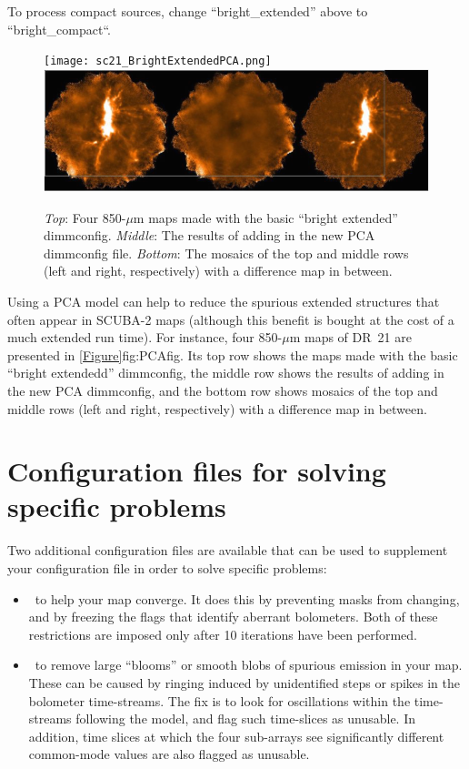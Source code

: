 To process compact sources, change “bright\_extended” above to “bright\_compact“.

\begin{figure}
\texttt{[image: sc21\_BrightExtendedPCA.png]}\\
\includegraphics[width=0.9\linewidth]{sc21_PCADifference.png}
\caption[PCA dimmconfig results]
   {\textit{Top}: Four 850-$\mu$m maps made with the basic ``bright extended'' dimmconfig. \textit{Middle}: The results of adding in the new PCA dimmconfig file. \textit{Bottom}: The mosaics of the top and middle rows (left and right, respectively) with a difference map in between.}
   \label{fig:PCAfig}
\end{figure}

Using a PCA model can help to reduce the spurious extended structures
that often appear in SCUBA-2 maps (although this benefit is bought at
the cost of a much extended run time). For instance, four 850-$\mu$m
maps of DR~21 are presented in \cref{Figure}{fig:PCAfig}{}.  Its top
row shows the maps made with the basic ``bright extendedd''
dimmconfig, the middle row shows the results of adding in the new PCA
dimmconfig, and the bottom row shows mosaics of the top and middle
rows (left and right, respectively) with a difference map in between.

\section{Configuration files for solving specific problems}
\label{sec:problem}

Two additional configuration files are available that can be used to supplement your
configuration file in order to solve specific problems:

\begin{itemize}[noitemsep]

\item \fixconvergence\ to help your map converge. It does this by preventing masks
from changing, and by freezing the flags that identify aberrant bolometers. Both of
these restrictions are imposed only after 10 iterations have been performed.

\item \fixblobs\ to remove large ``blooms'' or smooth blobs of spurious emission
in your map. These can be caused by ringing induced by unidentified steps or
spikes in the bolometer time-streams. The fix is to look for oscillations
within the time-streams following the  model, and flag such
time-slices as unusable.  In addition, time slices at which the four sub-arrays
see significantly different common-mode values are also flagged as unusable.

\end{itemize}

